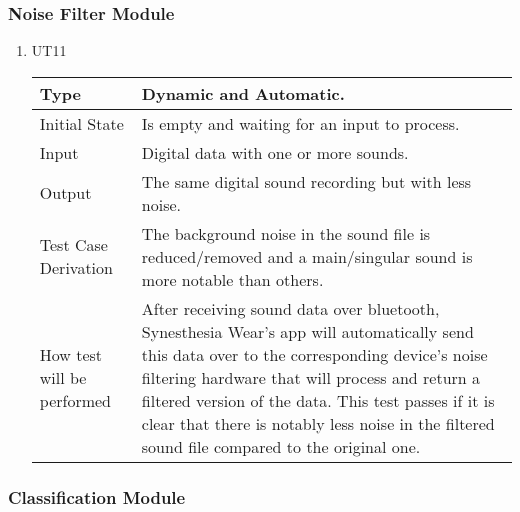 \documentclass[12pt, titlepage]{article}
\begin{document}
\subsubsection{Noise Filter Module}

\begin{enumerate}

\item{UT11\\}

\begin{tabular}{ |p{5cm}||p{7cm}| }
    \hline
    Type & Dynamic and Automatic. \\
    \hline
    Initial State  &  Is empty and waiting for an input to process. \\
    \hline
    Input &   Digital data with one or more sounds. \\
    \hline
    Output &   The same digital sound recording but with less noise.  \\
    \hline
    Test Case Derivation &   The background noise in the sound file is reduced/removed and a main/singular sound is more notable than others. \\
    \hline
    How test will be performed & After receiving sound data over bluetooth, Synesthesia Wear’s app will automatically send this data over to the corresponding device’s noise filtering hardware that will process and return a filtered version of the data. This test passes if it is clear that there is notably less noise in the filtered sound file compared to the original one. \\
    \hline
\end{tabular}

\end{enumerate}


\subsubsection{Classification Module}
\end{document}
